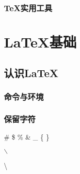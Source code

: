 \documentclass[twoside]{ctexart} %
\begin{document}
        \subsubsection{\TeX 实用工具}

\section{\LaTeX 基础}
    \subsection{认识\LaTeX}
        \subsubsection{命令与环境}
        \subsubsection{保留字符}
            \# 
            \$ 
            \% %
            \& 
            \_ 
            \{ 
            \} 

            $\backslash$

            \textbackslash

            \texttt{}

            {\ttfamily {}}
            
\end{document}
